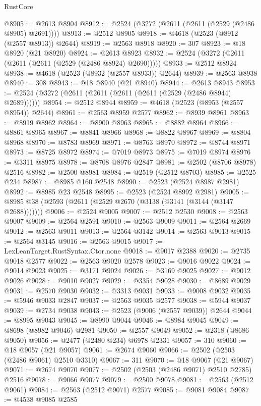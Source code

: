 \begin{lexlean}{RustCore}
\begin{coremodule}
@8905 := @2613 @8904
@8912 := @2524 (@3272 (@2611 (@2611 (@2529 (@2486 @8905) @2691))))
@8913 := @2512 @8905
@8918 := @4618 (@2523 (@8912 (@2557 @8913)) @2644)
@8919 := @2563 @8918
@8920 := 307
@8923 := @18 @8920 (@21 @8920)
@8924 := @2613 @8923
@8932 := @2524 (@3272 (@2611 (@2611 (@2611 (@2529 (@2486 @8924) @2690)))))
@8933 := @2512 @8924
@8938 := @4618 (@2523 (@8932 (@2557 @8933)) @2644)
@8939 := @2563 @8938
@8940 := 308
@8943 := @18 @8940 (@21 @8940)
@8944 := @2613 @8943
@8953 := @2524 (@3272 (@2611 (@2611 (@2611 (@2611 (@2529 (@2486 @8944) @2689))))))
@8954 := @2512 @8944
@8959 := @4618 (@2523 (@8953 (@2557 @8954)) @2644)
@8961 := @2563 @8959 @2577
@8962 := @8939 @8961
@8963 := @8919 @8962
@8964 := @8900 @8963
@8965 := @8882 @8964
@8966 := @8861 @8965
@8967 := @8841 @8966
@8968 := @8822 @8967
@8969 := @8804 @8968
@8970 := @8783 @8969
@8971 := @8763 @8970
@8972 := @8744 @8971
@8973 := @8725 @8972
@8974 := @7019 @8973
@8975 := @7019 @8974
@8976 := @3311 @8975
@8978 := @8708 @8976 @2847
@8981 := @2502 (@8706 @8978) @2516
@8982 := @2500 @8981
@8984 := @2519 (@2512 @8703)
@8985 := @2525 @234
@8987 := @8985 @160 @2548
@8990 := @2523 (@2524 @8987 @2981)
@8992 := @8985 @23 @2548
@8995 := @2523 (@2524 @8992 @2981)
@9005 := @8985 @38 (@2593 (@2611 (@2529 @2670 (@3138 (@3141 (@3144 (@3147 @2688)))))))
@9006 := @2524 @9005
@9007 := @2512 @2530
@9008 := @2563 @9007
@9009 := @2564 @2591
@9010 := @2563 @9009
@9011 := @2564 @2669
@9012 := @2563 @9011
@9013 := @2564 @3142
@9014 := @2563 @9013
@9015 := @2564 @3145
@9016 := @2563 @9015
@9017 := LexLeanTarget.RustSyntax.Ctor.none
@9018 := @9017 @2388
@9020 := @2735 @9018 @2577
@9022 := @2563 @9020 @2578
@9023 := @9016 @9022
@9024 := @9014 @9023
@9025 := @3171 @9024
@9026 := @3169 @9025
@9027 := @9012 @9026
@9028 := @9010 @9027
@9029 := @3354 @9028
@9030 := @8689 @9029
@9031 := @2570 @9030
@9032 := @3313 @9031
@9033 := @9008 @9032
@9035 := @5946 @9033 @2847
@9037 := @2563 @9035 @2577
@9038 := @5944 @9037
@9039 := @2734 @9038
@9043 := @2523 (@9006 (@2557 @9039)) @2644
@9044 := @8995 @9043
@9045 := @8990 @9044
@9046 := @8984 @9045
@9049 := @8698 (@8982 @9046) @2981
@9050 := @2557 @9049
@9052 := @2318 (@8686 @9050)
@9056 := @2477 (@2480 @234) @6978 @2331
@9057 := 310
@9060 := @18 @9057 (@21 @9057)
@9061 := @2674 @9060
@9066 := @2502 (@2503 (@2486 @9061) @2510 @3310)
@9067 := 311
@9070 := @18 @9067 (@21 @9067)
@9071 := @2674 @9070
@9077 := @2502 (@2503 (@2486 @9071) @2510 @2785) @2516
@9078 := @9066 @9077
@9079 := @2500 @9078
@9081 := @2563 (@2512 @9061)
@9084 := @2563 (@2512 @9071) @2577
@9085 := @9081 @9084
@9087 := @4538 @9085 @2585

\end{coremodule}
\end{lexlean}
